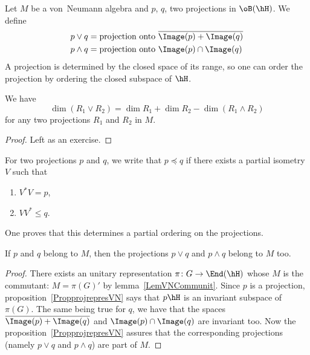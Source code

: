 Let $M$ be a von~Neumann algebra and $p$, $q$, two projections in $\oB(\hH)$. We define
\begin{align}
	p\vee q   & =\text{projection onto }\overline{ \Image(p)+\Image(q) } \\
	p\wedge q & =\text{projection onto }\Image(p)\cap\Image(q)
\end{align}
A projection is determined by the closed space of its range, so one can order the projection by ordering the closed subspace of $\hH$.

\begin{lemma}		\label{LemDimSupDeuxProjs}
	We have
	\begin{equation}
		\dim(R_1\vee R_2)=\dim R_1+\dim R_2-\dim(R_1\wedge R_2)
	\end{equation}
	for any two projections $R_1$ and $R_2$ in $M$.
\end{lemma}

\begin{proof}
	Left as an exercise.
\end{proof}

For two projections $p$ and $q$, we write that $p\preceq q$ if there exists a partial isometry $V$ such that
\begin{enumerate}
	\item $V^*V=p$,
	\item $VV^*\leq q$.
\end{enumerate}
One proves that this determines a partial ordering on the projections.

\begin{proposition}
	If $p$ and $q$ belong to $M$, then the projections $p\vee q$ and $p\wedge q$ belong to $M$ too.
\end{proposition}

\begin{proof}
	There exists an unitary representation $\pi\colon G\to \End(\hH)$ whose $M$ is the commutant: $M=\pi(G)'$ by lemma~\ref{LemVNCommunit}. Since $p$ is a projection, proposition~\ref{PropprojrepresVN} says that $p\hH$ is an invariant subspace of $\pi(G)$. The same being true for $q$, we have that the spaces $\overline{ \Image(p)+\Image(q) }$ and $\Image(p)\cap\Image(q)$ are invariant too. Now the proposition~\ref{PropprojrepresVN} assures that the corresponding projections (namely $p\vee q$ and $p\wedge q$) are part of $M$.
\end{proof}

